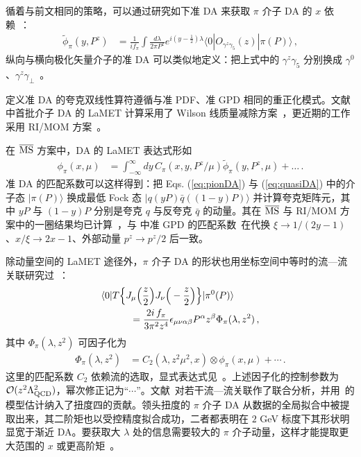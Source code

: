 循着与前文相同的策略，可以通过研究如下准 DA 来获取 $\pi$ 介子 DA 的 $x$ 依赖~\cite{Ji:2015qla,Zhang:2017bzy}：
\begin{align}\label{eq:quasiDA}
	\tilde\phi_{\pi}(y, P^z)&={\frac{1}{if_{\pi}}}\int \frac{d\lambda}{2\pi P^z}e^{i (y-\frac 1 2) \lambda}\langle 0|{O}_{\gamma^z\gamma_5}(z)|\pi(P)\rangle\,,
\end{align}
纵向与横向极化矢量介子的准 DA 可以类似地定义：把上式中的 $\gamma^z\gamma_5$ 分别换成 $\gamma^0$、$\gamma^z\gamma_\perp$~\cite{Liu:2018tox}。


定义准 DA 的夸克双线性算符遵循与准 PDF、准 GPD 相同的重正化模式。文献中首批介子 DA 的 LaMET 计算采用了 Wilson 线质量减除方案~\cite{Zhang:2017bzy,Chen:2017gck}，更近期的工作采用 RI/MOM 方案~\cite{Zhang:2020gaj}。

在 ${\overline{\rm MS}}$ 方案中，DA 的 LaMET 表达式形如~\cite{Ji:2015qla,Liu:2018tox}
\begin{align}\label{eq:matching2}
	\phi_\pi(x,\mu) &=\int_{-\infty}^\infty dy\, C_{\pi}\left(x,y,P^z/\mu\right) \tilde\phi_\pi(y,P^z,\mu)+\ldots\,.
\end{align}
准 DA 的匹配系数可以这样得到：把 Eqs. (\ref{eq:pionDA}) 与 (\ref{eq:quasiDA}) 中的介子态 $| \pi(P)\rangle$ 换成最低 Fock 态 $| q(y P) \bar q((1-y)P)\rangle$ 并计算夸克矩阵元，其中 $y P$ 与 $(1-y)P$ 分别是夸克 $q$ 与反夸克 $\bar q$ 的动量。其在 ${\overline{\rm MS}}$ 与 RI/MOM 方案中的一圈结果均已计算~\cite{Liu:2018tox}，与  中准 GPD 的匹配系数~\cite{Ji:2015qla,Xiong:2015nua,Liu:2019urm}在代换 $\xi\to 1/(2y-1)$、$x/\xi\to 2x-1$、外部动量 $p^z\to p^z/2$ 后一致。

除动量空间的 LaMET 途径外，$\pi$ 介子 DA 的形状也用坐标空间中等时的流—流关联研究过~\cite{Bali:2017gfr,Bali:2018spj}：
\begin{align}
	&\langle 0 | T\Big\{J_\mu\Big(\frac{z}{2}\Big) J_\nu\Big(-\frac{z}{2}\Big)\Big\}| \pi^0(P)\rangle \nonumber\\
	& \hspace{3em}= \frac{2i\, f_\pi}{3 \pi^2 z^4} \epsilon_{\mu\nu\alpha\beta} P^\alpha z^\beta \Phi_\pi(\lambda, z^2)\,,
	\label{eq:pigg-in-z-space}
\end{align}
其中 $\Phi_\pi(\lambda, z^2)$ 可因子化为
\begin{align} \label{twist_decomposition_heuristic}
	\Phi_\pi(\lambda, z^2) &= C_2 (\lambda,z^2\mu^2, x)\otimes \phi_\pi(x,\mu)+\cdots\,.
\end{align}
这里的匹配系数 $C_2$ 依赖流的选取，显式表达式见~\cite{Bali:2018spj}。上述因子化的控制参数为 ${\mathcal O}(z^2\Lambda_{\rm QCD}^2)$，幂次修正记为``$\cdots$''。文献~\cite{Bali:2018spj}对若干流—流关联作了联合分析，并用~\cite{Braun:1989iv,Ball:2006wn}的模型估计纳入了扭度四的贡献。{领头扭度的 $\pi$ 介子 DA 从数据的全局拟合中被提取出来，其二阶矩也以受控精度拟合成功}，二者都表明在 $2$ GeV 标度下其形状明显宽于渐近 DA。要获取大 $\lambda$ 处的信息需要较大的 $\pi$ 介子动量，这样才能提取更大范围的 $x$ 或更高阶矩~\cite{Bali:2017gfr}。

